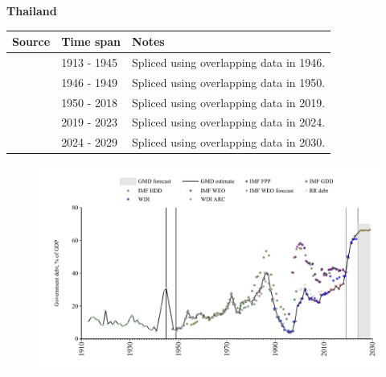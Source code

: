 \documentclass[12pt,a4paper,landscape]{article}
\begin{document}
\begin{adjustbox}{max totalsize={\paperwidth}{\paperheight},center}
\begin{minipage}[t][\textheight][t]{\textwidth}
\vspace*{0.5cm}
{}
\begin{center}
{\Large\bfseries Thailand}
\end{center}
\vspace{0.5cm}
\begin{table}[H]
\centering
\small
\begin{tabular}{|l|l|l|}
\hline
\textbf{Source} & \textbf{Time span} & \textbf{Notes} \\
\hline
\rowcolor{white}\cite{RR_debt}& 1913 - 1945 &Spliced using overlapping data in 1946.\\
\rowcolor{lightgray}\cite{IMF_FPP}& 1946 - 1949 &Spliced using overlapping data in 1950.\\
\rowcolor{white}\cite{IMF_GDD}& 1950 - 2018 &Spliced using overlapping data in 2019.\\
\rowcolor{lightgray}\cite{IMF_FPP}& 2019 - 2023 &Spliced using overlapping data in 2024.\\
\rowcolor{white}\cite{IMF_WEO_forecast}& 2024 - 2029 &Spliced using overlapping data in 2030.\\
\hline
\end{tabular}
\end{table}
\begin{figure}[H]
\centering
\includegraphics[width=\textwidth,height=0.6\textheight,keepaspectratio]{graphs/THA_govdebt_GDP.pdf}
\end{figure}
\end{minipage}
\end{adjustbox}
\end{document}
